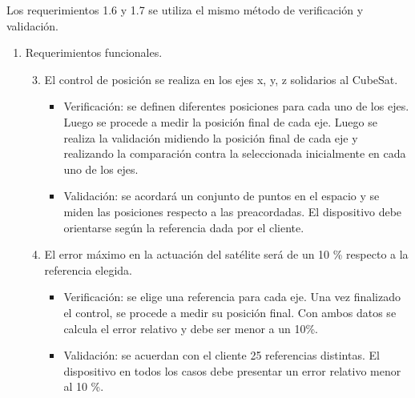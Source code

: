 \documentclass[
11pt, %
]{charter}
\begin{document}
	Los requerimientos 1.6 y 1.7 se utiliza el mismo método de verificación y validación. 
\begin{enumerate}

	\item Requerimientos funcionales.
	\begin{enumerate}
		\setcounter{enumii}{2}
		\item El control de posición se realiza en los ejes x, y, z solidarios al CubeSat.%
			\begin{itemize}
				\item Verificación: 
				se definen diferentes posiciones para cada uno de los ejes. Luego se procede a medir la posición final de cada eje. 
				Luego se realiza la validación midiendo la posición final de cada eje y realizando la comparación contra la seleccionada inicialmente en cada uno de los ejes. 
				\item Validación: se acordará un conjunto de puntos en el espacio y se miden las posiciones respecto a las preacordadas. El dispositivo debe orientarse según la referencia dada por el cliente. 
			\end{itemize}

		
		\item El error máximo en la actuación del satélite será de un 10 \% respecto a la referencia elegida. %
			\begin{itemize}
				\item Verificación: 
				 se elige una referencia para cada eje. Una vez finalizado el control, se procede a medir su posición final. 
				 Con ambos datos se calcula el error relativo y debe ser menor a un 10\%.
				\item Validación: se acuerdan con el cliente 25 referencias distintas. El dispositivo en todos los casos debe presentar un error relativo menor al 10 \%.					
			\end{itemize}


\end{enumerate}
\end{enumerate}
\end{document}
